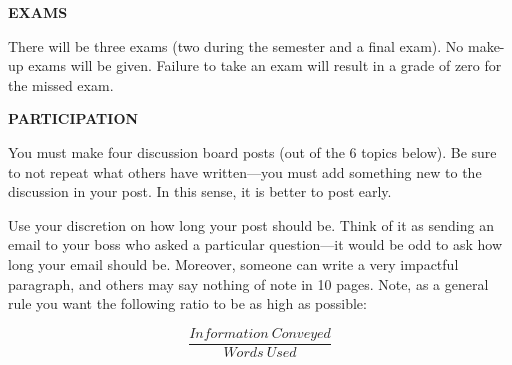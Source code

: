 \documentclass{article}
\begin{document}
\begin{center}
{\bf EXAMS} 
\end{center}
There will be three exams (two during the semester and a final exam). No make-up exams will be given.  Failure to take an exam will result in a grade of zero for the missed exam.  
\begin{center}
{\bf PARTICIPATION} 
\end{center}
You must make four discussion board posts (out of the 6 topics below).  Be sure to not repeat what others have written---you must add something new to the discussion in your post.  In this sense, it is better to post early.

Use your discretion on how long your post should be. Think of it as sending an email to your boss who asked a particular question---it would be odd to ask how long your email should be.  Moreover, someone can write a very impactful paragraph, and others may say nothing of note in 10 pages. Note, as a general rule you want the following ratio to be as high as possible:

$$\frac{Information\ Conveyed}{Words\ Used}$$
\end{document}
